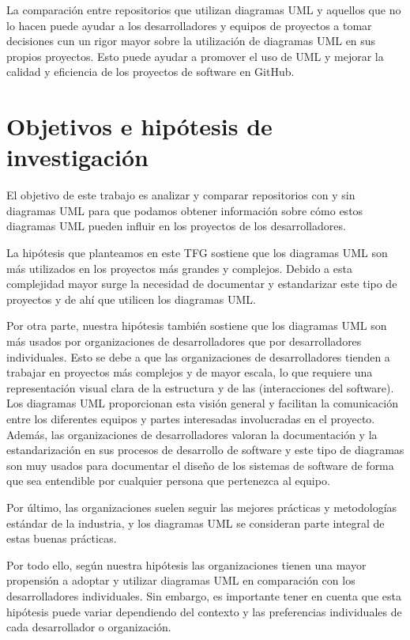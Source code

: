 \documentclass[a4paper, 12pt]{book}
\begin{document}
La comparación entre repositorios que utilizan diagramas UML y aquellos que no lo hacen puede ayudar a los desarrolladores y equipos de proyectos a tomar decisiones cun un rigor mayor sobre la utilización de diagramas UML en sus propios proyectos.
Esto puede ayudar a promover el uso de UML y mejorar la calidad y eficiencia de los proyectos de software en GitHub.


\section{Objetivos e hipótesis de investigación} %
\label{sec:bbjetivos e hipótesis de investigación} %


El objetivo de este trabajo es analizar y comparar repositorios con y sin diagramas UML para que podamos obtener información sobre cómo estos diagramas UML pueden influir en los proyectos de los desarrolladores. 


La hipótesis que planteamos en este TFG sostiene que los diagramas UML son más utilizados en los proyectos más grandes y complejos.
Debido a esta complejidad mayor surge la necesidad de documentar y estandarizar este tipo de proyectos y de ahí que utilicen los diagramas UML.


Por otra parte, nuestra hipótesis también sostiene que los diagramas UML son más usados por organizaciones de desarrolladores que por desarrolladores individuales.
Esto se debe a que las organizaciones de desarrolladores tienden a trabajar en proyectos más complejos y de mayor escala, lo que requiere una representación visual clara de la estructura y de las (interacciones del software).
Los diagramas UML proporcionan esta visión general y facilitan la comunicación entre los diferentes equipos y partes interesadas involucradas en el proyecto.
Además, las organizaciones de desarrolladores valoran la documentación y la estandarización en sus procesos de desarrollo de software y este tipo de diagramas son muy usados para documentar el diseño de los sistemas de software de forma que sea entendible por cualquier persona que pertenezca al equipo.


Por último, las organizaciones suelen seguir las mejores prácticas y metodologías estándar de la industria, y los diagramas UML se consideran parte integral de estas buenas prácticas. 


Por todo ello, según nuestra hipótesis las organizaciones tienen una mayor propensión a adoptar y utilizar diagramas UML en comparación con los desarrolladores individuales. 
Sin embargo, es importante tener en cuenta que esta hipótesis puede variar dependiendo del contexto y las preferencias individuales de cada desarrollador o organización.
\end{document}
